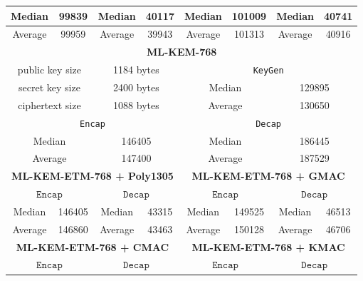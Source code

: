\documentclass[floatrow,journal=tches,submission]{iacrtrans}
\newcommand{\keygen}{\texttt{KeyGen}}
\newcommand{\encap}{\texttt{Encap}}
\newcommand{\decap}{\texttt{Decap}}
\begin{document}
\begin{table}
\begin{tabular}{|c|c|c|c|c|c|c|c|}
        Median & 99839 & Median & 40117 & Median & 101009 & Median & 40741 \\
        \hline
        Average & 99959 & Average & 39943 & Average & 101313 & Average & 40916 \\
        \hline\hline
        \multicolumn{8}{|c|}{\bf ML-KEM-768} \\
        \hline
        \multicolumn{2}{|c|}{public key size} 
        & \multicolumn{2}{|c|}{1184 bytes}
        & \multicolumn{4}{|c|}{ \keygen} \\
        \hline
        \multicolumn{2}{|c|}{secret key size} 
        & \multicolumn{2}{|c|}{2400 bytes} 
        & \multicolumn{2}{|c|}{Median} 
        & \multicolumn{2}{|c|}{129895} \\
        \hline
        \multicolumn{2}{|c|}{ciphertext size} 
        & \multicolumn{2}{|c|}{1088 bytes} 
        & \multicolumn{2}{|c|}{Average} 
        & \multicolumn{2}{|c|}{130650} \\
        \hline
        \multicolumn{4}{|c|}{ \encap}
        & \multicolumn{4}{|c|}{\decap} \\
        \hline
        \multicolumn{2}{|c|}{Median} 
        & \multicolumn{2}{|c|}{146405} 
        & \multicolumn{2}{|c|}{Median} 
        & \multicolumn{2}{|c|}{186445} \\
        \hline
        \multicolumn{2}{|c|}{Average} 
        & \multicolumn{2}{|c|}{147400} 
        & \multicolumn{2}{|c|}{Average} 
        & \multicolumn{2}{|c|}{187529} \\
        \hline
        \multicolumn{4}{|c|}{\bf ML-KEM-ETM-768 + Poly1305}
        & \multicolumn{4}{|c|}{\bf ML-KEM-ETM-768 + GMAC} \\
        \hline
        \multicolumn{2}{|c|}{ $\encap$}
        & \multicolumn{2}{|c|}{$\decap$}
        & \multicolumn{2}{|c|}{ $\encap$}
        & \multicolumn{2}{|c|}{$\decap$} \\
        \hline
        Median & 146405 & Median & 43315 
        & Median & 149525 & Median & 46513 \\
        \hline
        Average & 146860 & Average & 43463 
        & Average & 150128 & Average & 46706 \\
        \hline
        \multicolumn{4}{|c|}{\bf ML-KEM-ETM-768 + CMAC}
        & \multicolumn{4}{|c|}{\bf ML-KEM-ETM-768 + KMAC} \\
        \hline
        \multicolumn{2}{|c|}{ $\encap$}
        & \multicolumn{2}{|c|}{$\decap$}
        & \multicolumn{2}{|c|}{ $\encap$}
        & \multicolumn{2}{|c|}{$\decap$} \\

\end{tabular}
\end{table}
\end{document}
